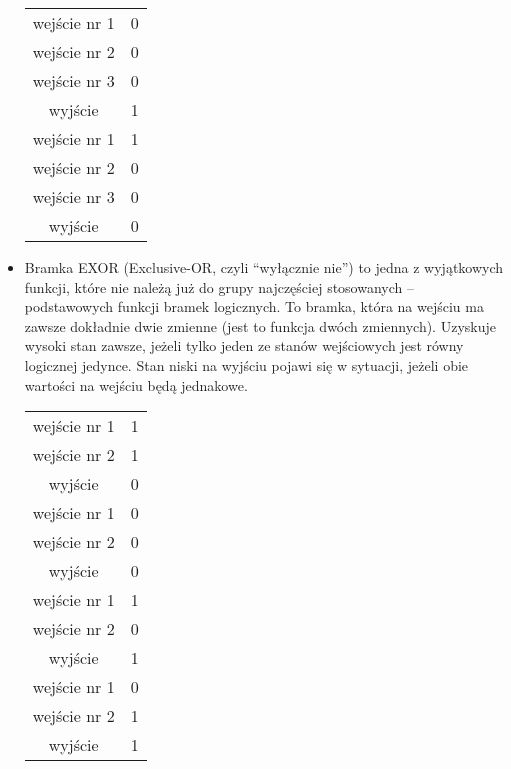 \documentclass[11pt]{article}
\begin{document}
\begin{itemize}
\begin{table}[h]
\begin{tabular}{|c|c|}
\hline
\hline
wejście nr 1&0\\
wejście nr 2&0\\
wejście nr 3&0\\
wyjście&1\\
\hline
\hline
wejście nr 1&1\\
wejście nr 2&0\\
wejście nr 3&0\\
wyjście&0\\
\hline
\end{tabular}
\end{table}
\item Bramka EXOR (Exclusive-OR, czyli “wyłącznie nie”) to jedna z wyjątkowych funkcji, które nie należą już do grupy najczęściej stosowanych – podstawowych funkcji bramek logicznych. To bramka, która na wejściu ma zawsze dokładnie dwie zmienne (jest to funkcja dwóch zmiennych). Uzyskuje wysoki stan zawsze, jeżeli tylko jeden ze stanów wejściowych jest równy logicznej jedynce. Stan niski na wyjściu pojawi się w sytuacji, jeżeli obie wartości na wejściu będą jednakowe. 
\begin{table}[h]
\centering
\begin{tabular}{|c|c|}
\hline
wejście nr 1&1\\
wejście nr 2&1\\
wyjście&0\\
\hline
\hline
wejście nr 1&0\\
wejście nr 2&0\\
wyjście&0\\
\hline
\hline
wejście nr 1&1\\
wejście nr 2&0\\
wyjście&1\\
\hline
\hline
wejście nr 1&0\\
wejście nr 2&1\\
wyjście&1\\
\hline
\end{tabular}
\end{table}
\end{itemize}
\end{document}
